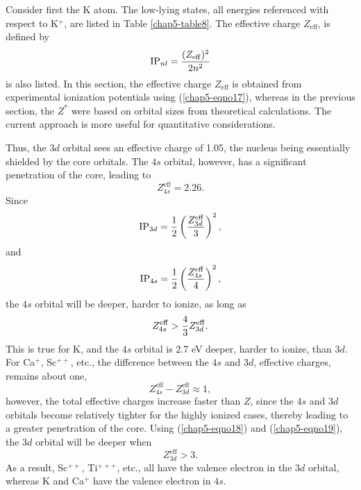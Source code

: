 Consider first the K atom. The low-lying states, all energies
referenced with respect to K$^+$, are listed in Table \ref{chap5-table8}.
The effective charge $Z_\mathrm{eff}$, is defined by
\begin{equation}
\mathrm{IP}_{nl} = {(Z_\mathrm{eff})^2 \over 2n^2}
\label{chap5-eqno17}
\end{equation}
is also listed. In this section, the effective charge $Z_\mathrm{eff}$ is obtained 
from experimental ionization potentials using (\ref{chap5-eqno17}),
whereas in the previous  
section, the $Z^*$ were based on orbital sizes from theoretical calculations. 
The current approach is more useful for quantitative considerations.

Thus, the $3d$ orbital sees an effective charge of 1.05, the nucleus 
being essentially shielded by the core orbitals. The $4s$ orbital, however, 
has a significant penetration of the core, leading to
\begin{equation}
Z^\mathrm{eff}_{4s} = 2.26 .
\end{equation}
Since
\begin{equation}
\mathrm{IP}_{3d} = {1 \over 2} \left( {Z^\mathrm{eff}_{3d} \over 3} \right)^2 ,
\end{equation}
and
\begin{equation}
\mathrm{IP}_{4s} = {1 \over 2} \left( {Z^\mathrm{eff}_{4s} \over 4} \right)^2 ,
\end{equation}
the $4s$ orbital will be deeper, harder to ionize, as long as
\begin{equation}
Z^\mathrm{eff}_{4s} > {4 \over 3} Z^\mathrm{eff}_{3d}.
\label{chap5-eqno18}
\end{equation}
This is true for K, and the $4s$ orbital is 2.7 eV deeper, harder to 
ionize, than $3d$.  For Ca$^+$, Sc$^{++}$, etc., the difference between 
the $4s$ and $3d$, effective charges, remains about one,
\begin{equation}
Z^\mathrm{eff}_{4s} - Z^\mathrm{eff}_{3d} \approx 1 ,
\label{chap5-eqno19}
\end{equation}
however, the total effective charges increase faster than $Z$, since the 
$4s$ and $3d$ orbitals become relatively tighter for the highly ionized 
cases, thereby leading to a greater penetration of the core. Using
(\ref{chap5-eqno18})  
and (\ref{chap5-eqno19}), the $3d$ orbital will be deeper when
\begin{equation}
Z^\mathrm{eff}_{3d} > 3 .
\end{equation}
As a result, Sc$^{++}$, Ti$^{+++}$, etc., all have the valence electron 
in the $3d$ orbital, whereas K and Ca$^+$ have the valence electron 
in $4s$.

